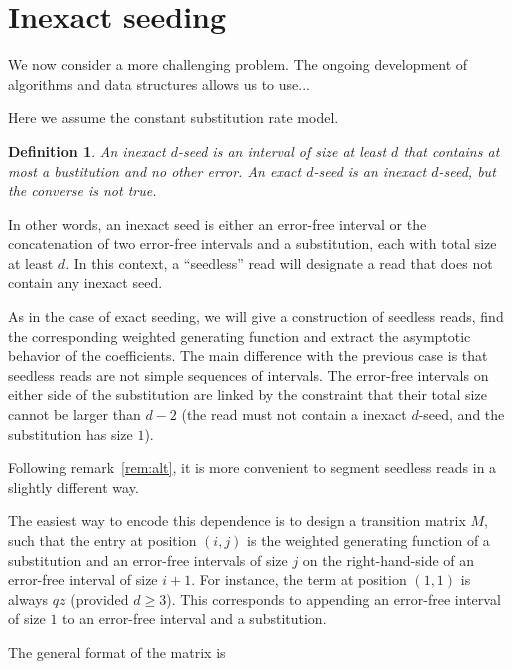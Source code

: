 \documentclass{article}
\newtheorem{definition}{Definition}
\begin{document}
\section{Inexact seeding}

We now consider a more challenging problem. The ongoing development of
algorithms and data structures allows us to use...

Here we assume the constant substitution rate model.

\begin{definition}
\label{def:seed}
An inexact $d$-seed is an interval of size at least $d$ that contains at
most a bustitution and no other error. An exact $d$-seed is an inexact
$d$-seed, but the converse is not true.
\end{definition}

In other words, an inexact seed is either an error-free interval or the
concatenation of two error-free intervals and a substitution, each with
total size at least $d$. In this context, a ``seedless'' read will
designate a read that does not contain any inexact seed.

As in the case of exact seeding, we will give a construction of seedless
reads, find the corresponding weighted generating function and extract the
asymptotic behavior of the coefficients. The main difference with the
previous case is that seedless reads are not simple sequences of
intervals. The error-free intervals on either side of the substitution are
linked by the constraint that their total size cannot be larger than $d-2$
(the read must not contain a inexact $d$-seed, and the substitution has
size $1$).

Following remark~\ref{rem:alt}, it is more convenient to segment seedless
reads in a slightly different way.

The easiest way to encode this dependence is to design a transition matrix
$M$, such that the entry at position $(i,j)$ is the weighted generating
function of a substitution and an error-free intervals of size $j$ on the
right-hand-side of an error-free interval of size $i+1$. For instance, the
term at position $(1,1)$ is always $qz$ (provided $d \geq 3$). This
corresponds to appending an error-free interval of size $1$ to an
error-free interval and a substitution.

The general format of the matrix is
\end{document}
